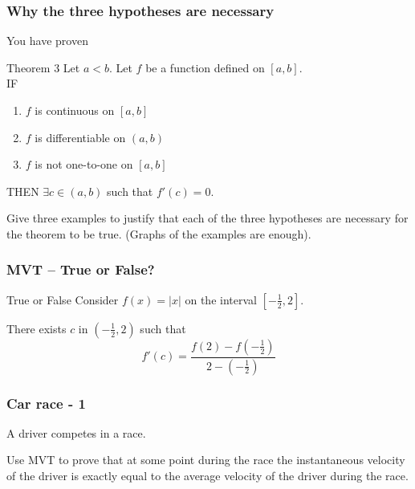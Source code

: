 \documentclass[14pt]{beamer}
\begin{document}

	\begin{frame}
		\frametitle{Why the three hypotheses are necessary}

		You have proven

		\begin{block}{Theorem 3}
			Let $a<b$. Let $f$ be a function defined on $[a,b]$. \\ IF
			\begin{enumerate}
				\item $f$ is continuous on $[a,b]$

				\item $f$ is differentiable on $(a,b)$

				\item $f$ is not one-to-one on $[a,b]$
			\end{enumerate}
			THEN $\displaystyle \exists c \in (a,b)$ such that $f'(c)=0$.
		\end{block}

		\vfill

		Give three examples to justify that each of the three hypotheses are necessary
		for the theorem to be true. (Graphs of the examples are enough).
	\end{frame}

	\begin{frame}[t]
		\frametitle{MVT -- True or False?}

		\begin{block}{True or False}
			Consider $f(x) = |x|$ on the interval $[-\frac{1}{2}, 2]$.

			There exists $c$ in $(-\frac{1}{2},2)$ such that
			\[
				f'(c) = \frac{f(2) - f(-\frac{1}{2})}{2-(-\frac{1}{2})}
			\]
		\end{block}
	\end{frame}


	\begin{frame}[t]
		\fontsize{13}{13}\selectfont
		\frametitle{Car race - 1}

		A driver competes in a race.

		Use MVT to prove that at some point during the race the instantaneous velocity
		of the driver is exactly equal to the average velocity of the driver during the
		race.
	\end{frame}
\end{document}
